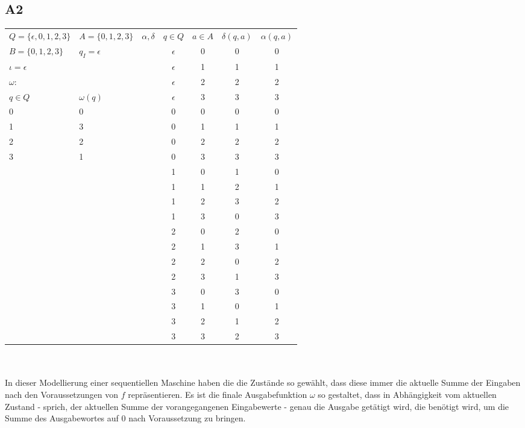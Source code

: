 \documentclass[12pt, a4paper]{article}
\begin{document}
\subsection*{A2}
\begin{tabular}{l l || c c c | c c}
    \( Q = \{ \epsilon, 0, 1, 2, 3 \} \)& \(A = \{0,1,2,3\}\) & \(\alpha, \delta\)&\(q \in Q\)&\(a \in A\)&\(\delta(q,a)\)&\(\alpha(q,a)\)\\
    \( B = \{0,1,2,3\} \) & \(q_I = \epsilon \)&&\(\epsilon\)&0&0&0\\
    \(\iota = \epsilon\)&&&\(\epsilon\)&1&1&1\\
    \(\omega\):&&&\(\epsilon\)&2&2&2\\
    \(q \in Q\) & \(\omega (q) \)&&\(\epsilon\)&3&3&3\\
    0&0&&0&0&0&0\\
    1 & 3&&0&1&1&1\\
    2 & 2&&0&2&2&2\\
    3 & 1&&0&3&3&3\\
    &&&1&0&1&0\\
    &&&1&1&2&1\\
    &&&1&2&3&2\\
    &&&1&3&0&3\\
    &&&2&0&2&0\\
    &&&2&1&3&1\\
    &&&2&2&0&2\\
    &&&2&3&1&3\\
    &&&3&0&3&0\\
    &&&3&1&0&1\\
    &&&3&2&1&2\\
    &&&3&3&2&3\\
\end{tabular}\\\\
In dieser Modellierung einer sequentiellen Maschine haben die die Zustände so gewählt, dass diese immer die aktuelle Summe der Eingaben nach
den Voraussetzungen von \(f\) repräsentieren. Es ist die finale Ausgabefunktion \(\omega\) so gestaltet, dass in Abhängigkeit vom aktuellen
Zustand - sprich, der aktuellen Summe der vorangegangenen Eingabewerte - genau die Ausgabe getätigt wird, die benötigt wird, um die Summe
des Ausgabewortes auf 0 nach Voraussetzung zu bringen.\\
\end{document}
